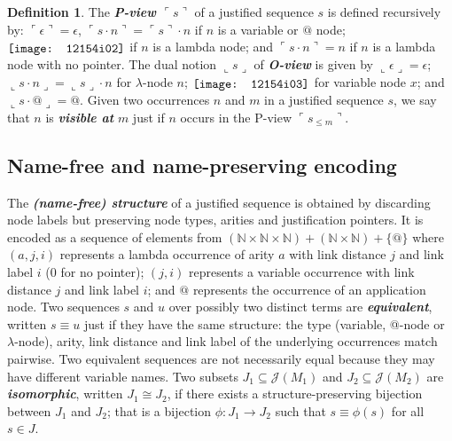\documentclass[xchauthor,chkrefs,GCNS,amsmath,amsthm,rotating,leaveRGB]{tcsg}
\renewcommand{\index}[1]{}
\theoremstyle{plain}
\theoremstyle{definition}
\newtheorem{definition}{Definition}[section]
\def\structisomorphic{\cong}
\def\justseqset{\mathcal{J}}
\begin{document}
\begin{definition}\label{def:views}
The \textbf{\emph{P-view $\ulcorner  s \urcorner  $}}\index{P-view $\ulcorner
s \urcorner  $} of a justified sequence $s$ is defined recursively by:
$\ulcorner  \epsilon   \urcorner   = \epsilon $, $\ulcorner  s \cdot  n
\urcorner   =  \ulcorner  s \urcorner   \cdot n$ if $n$ is a variable or $@$
node; $\raisebox{-1pt}{\texttt{[image: 12154i02]}}$ if $n$ is a lambda node; and  $\ulcorner
s \cdot  n  \urcorner    =  n$ if $n$ is a lambda node with no pointer. The
dual notion $\llcorner  s \lrcorner  $ of
\textbf{\emph{O-view}}\index{O-view} is given by $\llcorner  \epsilon
\lrcorner   = \epsilon $; $\llcorner  s \cdot  n  \lrcorner    =  \llcorner
s \lrcorner   \cdot n$ for $\lambda $-node $n$; $\raisebox{-1pt}{\texttt{[image: 12154i03]}}$
for variable node $x$; and $\llcorner  s \cdot  @  \lrcorner   = @$. Given
two occurrences $n$ and $m$ in a justified sequence $s$, we say that $n$ is
\textbf{\emph{visible at}}\index{visible at} $m$ just if $n$ occurs in the
P-view $\ulcorner  s_{\leq  m} \urcorner  $.
\end{definition}

\subsection{Name-free and name-preserving encoding}\label{sec2.6}

The \textbf{\emph{(name-free) structure}}\index{(name-free) structure} of a
justified sequence is obtained by discarding node labels but preserving
node types, arities and justification pointers. It is encoded as a sequence
of elements from $(\mathbb {N}\times \mathbb {N}\times \mathbb {N}) +
(\mathbb {N}\times \mathbb {N}) + \{ @ \}$ where $(a, j, i)$ represents a
lambda occurrence of arity $a$ with link distance $j$ and link label $i$ ($0$
for no pointer); $(j, i)$ represents a variable occurrence with link distance
$j$ and link label $i$; and $@$ represents the occurrence of an application
node. Two sequences $s$ and $u$ over possibly two distinct terms are
\textbf{\emph{equivalent}}\index{equivalent}, written $s \equiv u$ just if
they have the same structure: the type (variable, @-node or $\lambda $-node),
arity, link distance and link label of the underlying occurrences match
pairwise. Two equivalent sequences are not necessarily equal because they may
have different variable names. Two subsets $J_{1}\subseteq \justseqset
(M_{1})$ and $J_{2}\subseteq \justseqset (M_{2})$ are
\textbf{\emph{isomorphic}}\index{isomorphic}, written $J_{1}\structisomorphic
J_{2}$, if  there exists a structure-preserving bijection between $J_{1}$ and
$J_{2}$; that is a bijection $\phi :J_{1}\longrightarrow J_{2}$ such that
$s\equiv \phi (s)$ for all $s\in J$.
\end{document}
